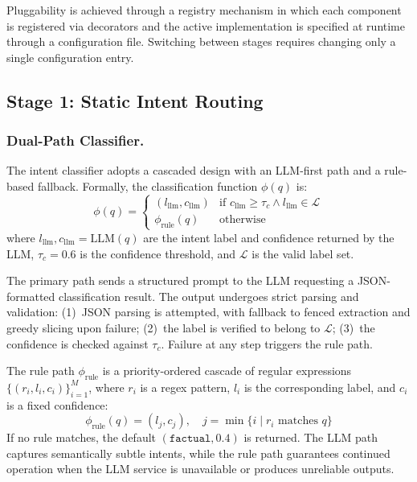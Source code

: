 \documentclass[runningheads]{llncs}
\begin{document}
Pluggability is achieved through a registry mechanism in which each component is registered via decorators and the active implementation is specified at runtime through a configuration file. Switching between stages requires changing only a single configuration entry.

\subsection{Stage 1: Static Intent Routing}

\subsubsection{Dual-Path Classifier.}

The intent classifier adopts a cascaded design with an LLM-first path and a rule-based fallback. Formally, the classification function $\phi(q)$ is:
\begin{equation}
    \phi(q) = \begin{cases}
    (l_{\text{llm}}, c_{\text{llm}}) & \text{if } c_{\text{llm}} \geq \tau_c \wedge l_{\text{llm}} \in \mathcal{L} \\
    \phi_{\text{rule}}(q) & \text{otherwise}
    \end{cases}
\end{equation}
where $l_{\text{llm}}, c_{\text{llm}} = \text{LLM}(q)$ are the intent label and confidence returned by the LLM, $\tau_c = 0.6$ is the confidence threshold, and $\mathcal{L}$ is the valid label set.

The primary path sends a structured prompt to the LLM requesting a JSON-formatted classification result. The output undergoes strict parsing and validation: (1)~JSON parsing is attempted, with fallback to fenced extraction and greedy slicing upon failure; (2)~the label is verified to belong to $\mathcal{L}$; (3)~the confidence is checked against $\tau_c$. Failure at any step triggers the rule path.

The rule path $\phi_{\text{rule}}$ is a priority-ordered cascade of regular expressions $\{(r_i, l_i, c_i)\}_{i=1}^{M}$, where $r_i$ is a regex pattern, $l_i$ is the corresponding label, and $c_i$ is a fixed confidence:
\begin{equation}
    \phi_{\text{rule}}(q) = (l_j, c_j), \quad j = \min\{i \mid r_i \text{ matches } q\}
\end{equation}
If no rule matches, the default $(\texttt{factual}, 0.4)$ is returned. The LLM path captures semantically subtle intents, while the rule path guarantees continued operation when the LLM service is unavailable or produces unreliable outputs.
\end{document}
